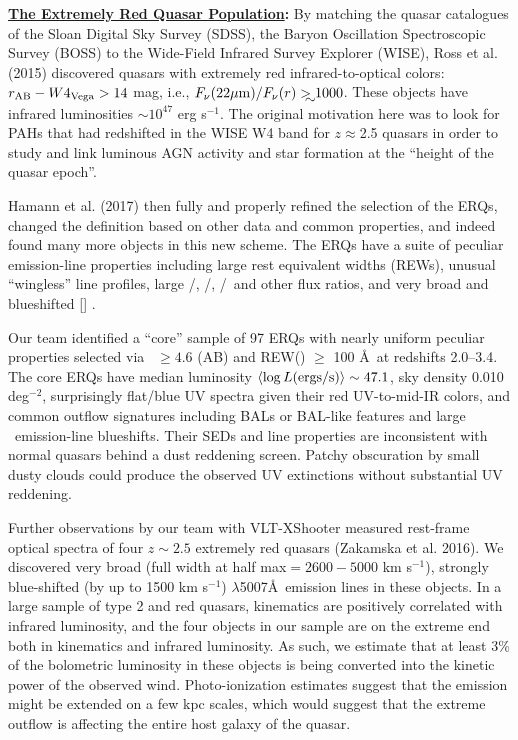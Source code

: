 \medskip
\medskip

\smallskip
\smallskip
\noindent
{\bf \underline{The Extremely Red Quasar Population}:}
By matching the quasar catalogues of the Sloan Digital Sky Survey
(SDSS), the Baryon Oscillation Spectroscopic Survey (BOSS) to the
Wide-Field Infrared Survey Explorer (WISE), Ross et al. (2015)
discovered quasars with extremely red infrared-to-optical colors:
$r_{\rm AB}-W4_{\rm Vega}>14$ mag, i.e., $F_\nu({\rm 22\mu
m})/F_\nu(r) \gtrsim 1000$.  These objects have infrared luminosities
$\sim 10^{47}$ erg s$^{-1}$.  The original motivation here was to look
for PAHs that had redshifted in the WISE W4 band for $z\approx$2.5
quasars in order to study and link luminous AGN activity and star
formation at the ``height of the quasar epoch''.

\smallskip
\smallskip
\noindent
Hamann et al. (2017) then fully and properly refined the selection of
the ERQs, changed the definition based on other data and common
properties, and indeed found many more objects in this new scheme. The
ERQs have a suite of peculiar emission-line properties including large
rest equivalent widths (REWs), unusual ``wingless'' line profiles,
large \nv /\lya , \nv /\civ , \siiv /\civ\ and other flux ratios, and
very broad and blueshifted [\oiii ] .

\smallskip
\smallskip
\noindent
Our team identified a ``core'' sample of 97 ERQs
with nearly uniform peculiar properties selected via \imw\ $\ge 4.6$
(AB) and REW(\civ ) $\ge$ 100 \AA\ at redshifts 2.0--3.4. 
 The core ERQs have median luminosity $\left<\log L
({\rm ergs/s})\right> \sim 47.1$, sky density 0.010 deg$^{-2}$,
surprisingly flat/blue UV spectra given their red UV-to-mid-IR colors,
and common outflow signatures including BALs or BAL-like features and
large \civ\ emission-line blueshifts. Their SEDs and line properties
are inconsistent with normal quasars behind a dust reddening
screen. Patchy obscuration by small dusty clouds
could produce the observed UV extinctions without substantial UV
reddening.

\smallskip
\smallskip
\noindent
Further observations by our team with VLT-XShooter measured rest-frame
optical spectra of four $z\sim 2.5$ extremely red quasars (Zakamska et al. 2016).  
We discovered very broad (full width at half max$= 2600-5000$ km
s$^{-1}$), strongly blue-shifted (by up to 1500 km s$^{-1}$)
\oiii$\lambda$5007\AA\ emission lines in these objects. In a large
sample of type 2 and red quasars, \oiii kinematics are positively
correlated with infrared luminosity, and the four objects in our
sample are on the extreme end both in \oiii kinematics and infrared
luminosity.
As such, we estimate that at least 3\% of the bolometric luminosity in
these objects is being converted into the kinetic power of the
observed wind. Photo-ionization estimates suggest that the \oiii
emission might be extended on a few kpc scales, which would suggest
that the extreme outflow is affecting the entire host galaxy of the
quasar.

